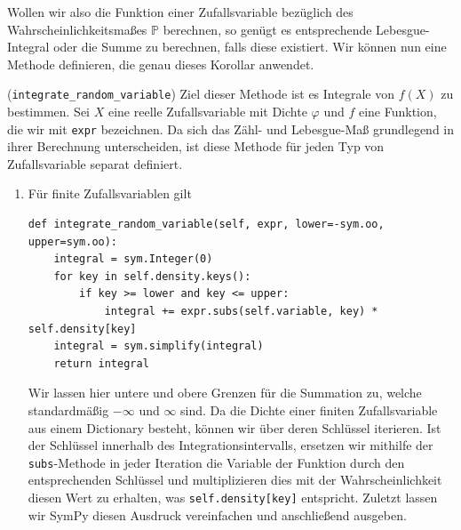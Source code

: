 Wollen wir also die Funktion einer Zufallsvariable bezüglich des Wahrscheinlichkeitsmaßes $\mathbb{P}$ berechnen, so genügt es entsprechende Lebesgue-Integral oder die Summe zu berechnen, falls diese existiert. Wir können nun eine Methode definieren, die genau dieses Korollar anwendet.

\begin{Code}{(\lstinline|integrate_random_variable|)}
\hypertarget{Code:Integrate}{}Ziel dieser Methode ist es Integrale von $f(X)$ zu bestimmen. Sei  $X$ eine reelle Zufallsvariable mit Dichte $\varphi$ und $f$ eine Funktion, die wir mit \lstinline|expr| bezeichnen. Da sich das Zähl- und Lebesgue-Maß grundlegend in ihrer Berechnung unterscheiden, ist diese Methode für jeden Typ von Zufallsvariable separat definiert.
\begin{enumerate}[label=(\roman*)]
\item Für finite Zufallsvariablen gilt
\begin{lstlisting}
def integrate_random_variable(self, expr, lower=-sym.oo, upper=sym.oo):
    integral = sym.Integer(0)
    for key in self.density.keys():
        if key >= lower and key <= upper:
            integral += expr.subs(self.variable, key) * self.density[key]
    integral = sym.simplify(integral)
    return integral
\end{lstlisting}

\newpage

Wir lassen hier untere und obere Grenzen für die Summation zu, welche standardmäßig $- \infty$ und $\infty$ sind. Da die Dichte einer finiten Zufallsvariable aus einem Dictionary besteht, können wir über deren Schlüssel iterieren. Ist der Schlüssel innerhalb des Integrationsintervalls, ersetzen wir mithilfe der \lstinline|subs|-Methode in jeder Iteration die Variable der Funktion durch den entsprechenden Schlüssel und multiplizieren dies mit der Wahrscheinlichkeit diesen Wert zu erhalten, was \lstinline|self.density[key]| entspricht. Zuletzt lassen wir SymPy diesen Ausdruck vereinfachen und anschließend ausgeben.


\end{enumerate}
\end{Code}
